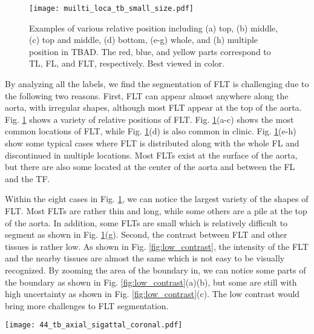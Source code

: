 \documentclass{article}
\begin{document}
\begin{figure}[!htb]
\centering
\texttt{[image: muilti\_loca\_tb\_small\_size.pdf]}
\caption{
Examples of various relative position including (a) top, (b) middle, (c) top and middle, (d) bottom, (e-g) whole, and (h) multiple position in TBAD. The red, blue, and yellow parts correspond to TL, FL, and FLT, respectively.
Best viewed in color.
}
\label{muilti_loca_tb}
\end{figure}



By analyzing all the labels, we find the segmentation of FLT is challenging due to the following two reasons.
First, FLT can appear almost anywhere along the aorta, with irregular shapes, although most FLT appear at the top of the aorta.
Fig. \ref{muilti_loca_tb} shows a variety of relative positions of FLT. Fig. \ref{muilti_loca_tb}(a-c) shows the most common locations of FLT, while Fig. \ref{muilti_loca_tb}(d) is also common in clinic. 
Fig. \ref{muilti_loca_tb}(e-h) show some typical cases where FLT is distributed along with the whole FL and discontinued in multiple locations.
Most FLTs exist at the surface of the aorta, but there are also some located at the center of the aorta and between the FL and the TF.

Within the eight cases in Fig. \ref{muilti_loca_tb}, we can notice the largest variety of the shapes of FLT.
Most FLTs are rather thin and long, while some others are a pile at the top of the aorta.
In addition, some FLTs are small which is relatively difficult to segment as shown in Fig. \ref{muilti_loca_tb}(g).
Second, the contrast between FLT and other tissues is rather low.
As shown in Fig. \ref{fig:low_contrast}, the intensity of the FLT and the nearby tissues are almost the same which is not easy to be visually recognized.
By zooming the area of the boundary in, we can notice some parts of the boundary as shown in Fig. \ref{fig:low_contrast}(a)(b), but some are still with high uncertainty as shown in Fig. \ref{fig:low_contrast}(c).
The low contrast would bring more challenges to FLT segmentation.




%
\begin{figure*}[!htb]
\centering
\texttt{[image: 44\_tb\_axial\_sigattal\_coronal.pdf]}
\caption{Example of low contrast images in the ImageTBAD dataset in three views: 
(a) coronal view, (b) axial view, and (c) sagittal view.
Red and yellow lines denote to the boundary of TL and FLT, respectively.
}
\label{fig:low_contrast}
\end{figure*}
\end{document}
